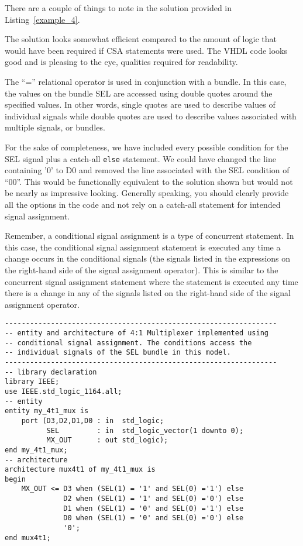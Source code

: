 There are a couple of things to note in the solution provided in Listing~\ref{example_4}.
\begin{my_list}
\item The solution looks somewhat efficient compared to the amount of logic that would have been required if CSA statements were used. The VHDL code looks good and is pleasing to the eye, qualities required for readability.
\item The ``='' relational operator is used in conjunction with a bundle. In this case, the values on the bundle SEL are accessed using double quotes around the specified values. In other words, single quotes are used to describe values of individual signals while double quotes are used to describe values associated with multiple signals, or bundles.
\item For the sake of completeness, we have included every possible condition for the SEL signal plus a catch-all \texttt{else} statement. We could have changed the line containing '0' to D0 and removed the line associated with the SEL condition of ``00''. This would be functionally equivalent to the solution shown but would not be nearly as impressive looking. Generally speaking, you should clearly provide all the options in the code and not rely on a catch-all statement for intended signal assignment.
\end{my_list}
Remember, a conditional signal assignment is a type of concurrent statement. In this case, the conditional signal assignment statement is executed any time a change occurs in the conditional signals (the signals listed in the expressions on the right-hand side of the signal assignment operator). This is similar to the concurrent signal assignment statement where the statement is executed any time there is a change in any of the signals listed on the right-hand side of the signal assignment operator.

\begin{lstlisting}[float, label=example_4_bis, caption=Alternative solution to Example~4 accessing individual signals.]
-----------------------------------------------------------------
-- entity and architecture of 4:1 Multiplexer implemented using
-- conditional signal assignment. The conditions access the
-- individual signals of the SEL bundle in this model.
-----------------------------------------------------------------
-- library declaration
library IEEE;
use IEEE.std_logic_1164.all;
-- entity
entity my_4t1_mux is
	port (D3,D2,D1,D0 : in  std_logic;
	      SEL         : in  std_logic_vector(1 downto 0);
	      MX_OUT      : out std_logic);
end my_4t1_mux;
-- architecture
architecture mux4t1 of my_4t1_mux is
begin
	MX_OUT <= D3 when (SEL(1) = '1' and SEL(0) ='1') else
	          D2 when (SEL(1) = '1' and SEL(0) ='0') else
	          D1 when (SEL(1) = '0' and SEL(0) ='1') else
	          D0 when (SEL(1) = '0' and SEL(0) ='0') else
	          '0';
end mux4t1;
\end{lstlisting}

